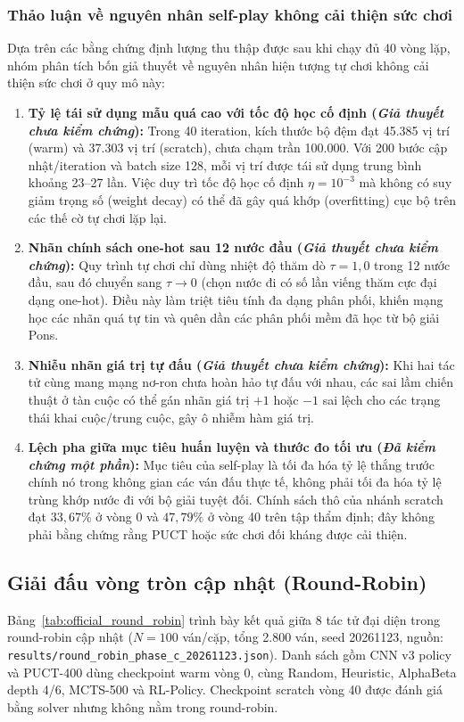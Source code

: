 \documentclass[11pt, a4paper]{article}
\begin{document}
\subsubsection{Thảo luận về nguyên nhân self-play không cải thiện sức chơi}
Dựa trên các bằng chứng định lượng thu thập được sau khi chạy đủ 40 vòng lặp, nhóm phân tích bốn giả thuyết về nguyên nhân hiện tượng tự chơi không cải thiện sức chơi ở quy mô này:
\begin{enumerate}
    \item \textbf{Tỷ lệ tái sử dụng mẫu quá cao với tốc độ học cố định (\textit{Giả thuyết chưa kiểm chứng}):} Trong 40 iteration, kích thước bộ đệm đạt 45.385 vị trí (warm) và 37.303 vị trí (scratch), chưa chạm trần 100.000. Với 200 bước cập nhật/iteration và batch size 128, mỗi vị trí được tái sử dụng trung bình khoảng 23--27 lần. Việc duy trì tốc độ học cố định $\eta = 10^{-3}$ mà không có suy giảm trọng số (weight decay) có thể đã gây quá khớp (overfitting) cục bộ trên các thế cờ tự chơi lặp lại.
    \item \textbf{Nhãn chính sách one-hot sau 12 nước đầu (\textit{Giả thuyết chưa kiểm chứng}):} Quy trình tự chơi chỉ dùng nhiệt độ thăm dò $\tau = 1{,}0$ trong 12 nước đầu, sau đó chuyển sang $\tau \to 0$ (chọn nước đi có số lần viếng thăm cực đại dạng one-hot). Điều này làm triệt tiêu tính đa dạng phân phối, khiến mạng học các nhãn quá tự tin và quên dần các phân phối mềm đã học từ bộ giải Pons.
    \item \textbf{Nhiễu nhãn giá trị tự đấu (\textit{Giả thuyết chưa kiểm chứng}):} Khi hai tác tử cùng mang mạng nơ-ron chưa hoàn hảo tự đấu với nhau, các sai lầm chiến thuật ở tàn cuộc có thể gán nhãn giá trị $+1$ hoặc $-1$ sai lệch cho các trạng thái khai cuộc/trung cuộc, gây ô nhiễm hàm giá trị.
    \item \textbf{Lệch pha giữa mục tiêu huấn luyện và thước đo tối ưu (\textit{Đã kiểm chứng một phần}):} Mục tiêu của self-play là tối đa hóa tỷ lệ thắng trước chính nó trong không gian các ván đấu thực tế, không phải tối đa hóa tỷ lệ trùng khớp nước đi với bộ giải tuyệt đối. Chính sách thô của nhánh scratch đạt $33{,}67\%$ ở vòng 0 và $47{,}79\%$ ở vòng 40 trên tập thẩm định; đây không phải bằng chứng rằng PUCT hoặc sức chơi đối kháng được cải thiện.
\end{enumerate}

\subsection{Giải đấu vòng tròn cập nhật (Round-Robin)}
Bảng~\ref{tab:official_round_robin} trình bày kết quả giữa 8 tác tử đại diện trong round-robin cập nhật ($N=100$ ván/cặp, tổng 2.800 ván, seed 20261123, nguồn: \texttt{results/round\_robin\_phase\_c\_20261123.json}). Danh sách gồm CNN v3 policy và PUCT-400 dùng checkpoint warm vòng 0, cùng Random, Heuristic, AlphaBeta depth 4/6, MCTS-500 và RL-Policy. Checkpoint scratch vòng 40 được đánh giá bằng solver nhưng không nằm trong round-robin.
\end{document}
